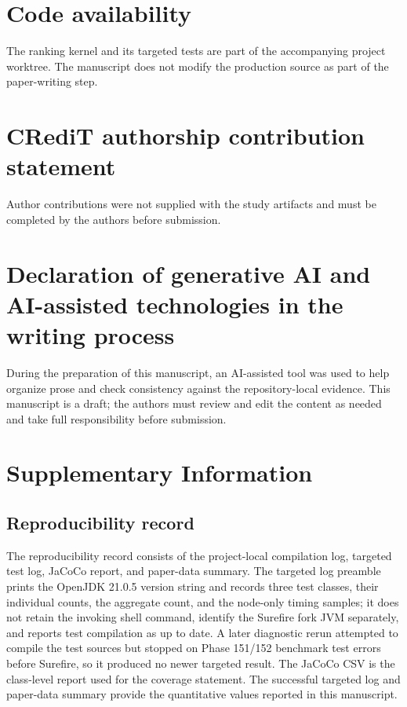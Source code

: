 \documentclass[review,12pt]{elsarticle}
\begin{document}
\section*{Code availability}
The ranking kernel and its targeted tests are part of the accompanying project worktree. The manuscript does not modify the production source as part of the paper-writing step.

\section*{CRediT authorship contribution statement}
Author contributions were not supplied with the study artifacts and must be completed by the authors before submission.

\section*{Declaration of generative AI and AI-assisted technologies in the writing process}
During the preparation of this manuscript, an AI-assisted tool was used to help organize prose and check consistency against the repository-local evidence. This manuscript is a draft; the authors must review and edit the content as needed and take full responsibility before submission.

\nolinenumbers
\clearpage



\clearpage
\appendix
\section{Supplementary Information}
\label{sec:supplementary}

\subsection{Reproducibility record}
\label{sec:si-repro}

The reproducibility record consists of the project-local compilation log, targeted test log, JaCoCo report, and paper-data summary. The targeted log preamble prints the OpenJDK 21.0.5 version string and records three test classes, their individual counts, the aggregate count, and the node-only timing samples; it does not retain the invoking shell command, identify the Surefire fork JVM separately, and reports test compilation as up to date. A later diagnostic rerun attempted to compile the test sources but stopped on Phase 151/152 benchmark test errors before Surefire, so it produced no newer targeted result. The JaCoCo CSV is the class-level report used for the coverage statement. The successful targeted log and paper-data summary provide the quantitative values reported in this manuscript.
\end{document}
